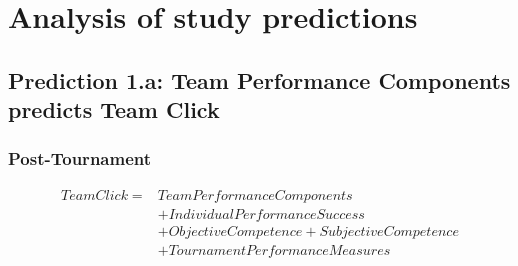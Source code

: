  \section{Analysis of study predictions\label{app8:analysisPredictions}}




 \subsection{Prediction 1.a: Team Performance Components predicts Team Click}


 \subsubsection{Post-Tournament}

 \begin{equation}
   \begin{align*}
     Team Click =  & Team Performance Components\\
               & + Individual Performance Success \\
               & + Objective Competence + Subjective Competence\\
               & + TournamentPerformanceMeasures \\
   \end{align*}
 \end{equation}
 \bigskip


 



